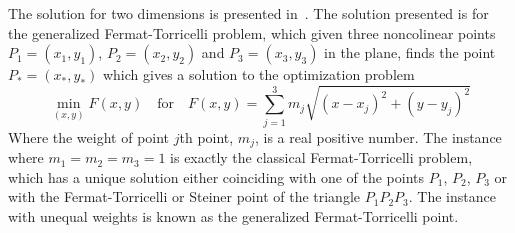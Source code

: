 The solution for two dimensions is presented in~\cite{Uteshev2012}.  The solution
presented is for the generalized Fermat-Torricelli problem, which given three
noncolinear points $P_1 = (x_1, y_1)$, $P_2 = (x_2, y_2)$ and $P_3 = (x_3, y_3)$
in the plane, finds the point $P_\ast = (x_\ast, y_\ast)$ which gives a solution
to the optimization problem
%
\begin{equation}
  \min_{(x,y)} F(x,y) \quad \text{for} \quad F(x,y) = \sum_{j=1}^3 m_j
  \sqrt{{(x-x_j)}^2 + {(y-y_j)}^2}
\end{equation}
%
Where the weight of point $j$th point, $m_j$, is a real positive number.  The
instance where $m_1 = m_2 = m_3 = 1$ is exactly the classical Fermat-Torricelli
problem, which has a unique solution either coinciding with one of the points
$P_1$, $P_2$, $P_3$ or with the Fermat-Torricelli or Steiner point of the
triangle $P_1 P_2 P_3$.  The instance with unequal weights is known as the
generalized Fermat-Torricelli point.

